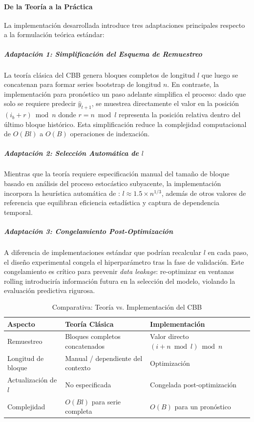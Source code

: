 \paragraph{De la Teoría a la Práctica}

La implementación desarrollada introduce tres adaptaciones principales respecto a la formulación teórica estándar:

\subparagraph{Adaptación 1: Simplificación del Esquema de Remuestreo}
La teoría clásica del CBB \parencite{politis1992circular} genera bloques completos de longitud $l$ que luego se concatenan para formar series bootstrap de longitud $n$. En contraste, la implementación para pronóstico un paso adelante simplifica el proceso: dado que solo se requiere predecir $\hat{y}_{t+1}$, se muestrea directamente el valor en la posición $(i_b + r) \bmod n$ donde $r = n \bmod l$ representa la posición relativa dentro del último bloque histórico. Esta simplificación reduce la complejidad computacional de $O(Bl)$ a $O(B)$ operaciones de indexación.

\subparagraph{Adaptación 2: Selección Automática de $l$}
Mientras que la teoría requiere especificación manual del tamaño de bloque basado en análisis del proceso estocástico subyacente, la implementación incorpora la heurística automática de \textcite{politis2004automatic}: $l \approx 1.5 \times n^{1/3}$, además de otros valores de referencia que equilibran eficiencia estadística y 
captura de dependencia temporal.

\subparagraph{Adaptación 3: Congelamiento Post-Optimización}
A diferencia de implementaciones estándar que podrían recalcular $l$ en cada paso, el diseño experimental congela el hiperparámetro tras la fase de validación. Este congelamiento es crítico para prevenir \textit{data leakage}: re-optimizar en ventanas rolling introduciría información futura en la selección del modelo, violando la evaluación predictiva rigurosa.

\begin{table}[htbp]
\centering
\caption{Comparativa: Teoría vs. Implementación del CBB}
\begin{tabular}{lll}
\toprule
\textbf{Aspecto} & \textbf{Teoría Clásica} & \textbf{Implementación} \\
\midrule
Remuestreo & Bloques completos concatenados & Valor directo $(i + n \bmod l) \bmod n$ \\
Longitud de bloque & Manual / dependiente del contexto & Optimización\\
Actualización de $l$ & No especificada & Congelada post-optimización \\
Complejidad & $O(Bl)$ para serie completa & $O(B)$ para un pronóstico \\
\bottomrule
\end{tabular}
\end{table}

